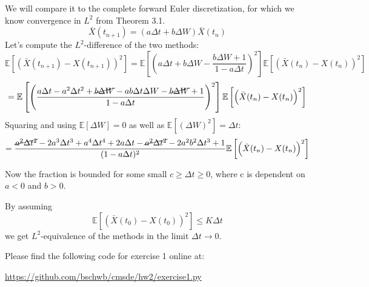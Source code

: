 \documentclass[a4paper,11pt]{scrartcl}
\newcommand*{\Xb}{\bar{X}}
\newcommand*{\D}{\Delta}
\newcommand*{\E}{\mathbb{E}}
\newcommand*{\EV}[1]{\E\left[{#1}\right]}
\newcommand*{\Lt}[1]{\EV{\left({#1}\right)^2}}
\begin{document}
\begin{enumerate}
\begin{enumerate}
  We will compare it to the complete forward Euler discretization, for which we
  know convergence in $L^2$ from Theorem 3.1.
  \[\Xb(t_{n+1}) = (a \D t + b \D W) \Xb(t_n)\]
  Let's compute the $L^2$-difference of the two methods:
  \[\Lt{\Xb(t_{n+1}) - X(t_{n+1})} = \Lt{a \D t + b \D W - \frac{b \D W + 1}{1 - a \D t}}
    \Lt{\Xb(t_{n}) - X(t_n)} \]
  \[ = \Lt{\frac{a \D t - a^2 \D t^2 +\cancel{b \D W} - a b \D t \D W -\cancel{b \D
       W} + 1}{1 - a \D t}}
    \Lt{\Xb(t_{n}) - X(t_n)} \]
  Squaring and using $\EV{\D W} = 0$ as well as $\EV{(\D W)^2} = \D t$:
  \[ = \frac{\cancel{a^2 \D t^2} - 2 a^3 \D t^3 + a^4 \D t^4 +
     2 a \D t -\cancel{a^2 \D t^2} -2 a^2 b^2 \D t^3 + 1}{(1 - a \D t)^2}
     \Lt{\Xb(t_n) - X(t_n)}
  \]

Now the fraction is bounded for some small $c \geq \D t \geq 0$, where c is
dependent on $a < 0$ and $b > 0$.

By assuming \[ \Lt{\Xb(t_0) - X(t_0)} \leq K \D t \]
we get $L^2$-equivalence of the methods in the limit $\D t \rightarrow 0$.
\end{enumerate}
\end{enumerate}

Please find the following code for exercise 1 online at:

\url{https://github.com/bschwb/cmsde/hw2/exercise1.py}


\end{document}

